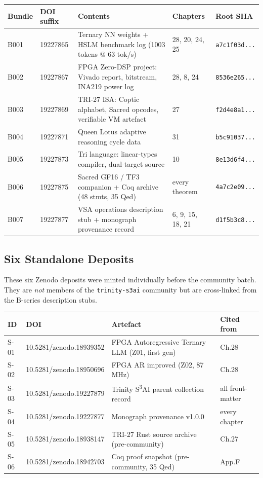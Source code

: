 \begin{small}
\begin{longtable}{@{}llp{4.2cm}ll@{}}
\toprule
\textbf{Bundle} & \textbf{DOI suffix} & \textbf{Contents} & \textbf{Chapters} & \textbf{Root SHA} \\
\midrule
\endhead
\bottomrule
\endlastfoot
B001 & 19227865 & Ternary NN weights + HSLM benchmark log (1003 tokens @ 63 tok/s) & 28, 20, 24, 25 & \texttt{a7c1f03d...} \\
B002 & 19227867 & FPGA Zero-DSP project: Vivado report, bitstream, INA219 power log & 28, 8, 24 & \texttt{8536e265...} \\
B003 & 19227869 & TRI-27 ISA: Coptic alphabet, Sacred opcodes, verifiable VM artefact & 27 & \texttt{f2d4e8a1...} \\
B004 & 19227871 & Queen Lotus adaptive reasoning cycle data & 31 & \texttt{b5c91037...} \\
B005 & 19227873 & Tri language: linear-types compiler, dual-target source & 10 & \texttt{8e13d6f4...} \\
B006 & 19227875 & Sacred GF16 / TF3 companion + Coq archive (48 stmts, 35 Qed) & every theorem & \texttt{4a7c2e09...} \\
B007 & 19227877 & VSA operations description stub + monograph provenance record & 6, 9, 15, 18, 21 & \texttt{d1f5b3c8...} \\
\end{longtable}
\end{small}

\subsection*{Six Standalone Deposits}

These six Zenodo deposits were minted individually before the community
batch. They are \emph{not} members of the \texttt{trinity-s3ai}
community but are cross-linked from the B-series description stubs.

\begin{small}
\begin{longtable}{@{}llp{4.5cm}l@{}}
\toprule
\textbf{ID} & \textbf{DOI} & \textbf{Artefact} & \textbf{Cited from} \\
\midrule
\endhead
\bottomrule
\endlastfoot
S-01 & 10.5281/zenodo.18939352 & FPGA Autoregressive Ternary LLM (Z01, first gen) & Ch.28 \\
S-02 & 10.5281/zenodo.18950696 & FPGA AR improved (Z02, 87 MHz) & Ch.28 \\
S-03 & 10.5281/zenodo.19227879 & Trinity S\textsuperscript{3}AI parent collection record & all front-matter \\
S-04 & 10.5281/zenodo.19227877 & Monograph provenance v1.0.0 & every chapter \\
S-05 & 10.5281/zenodo.18938147 & TRI-27 Rust source archive (pre-community) & Ch.27 \\
S-06 & 10.5281/zenodo.18942703 & Coq proof snapshot (pre-community, 35 Qed) & App.F \\
\end{longtable}
\end{small}

